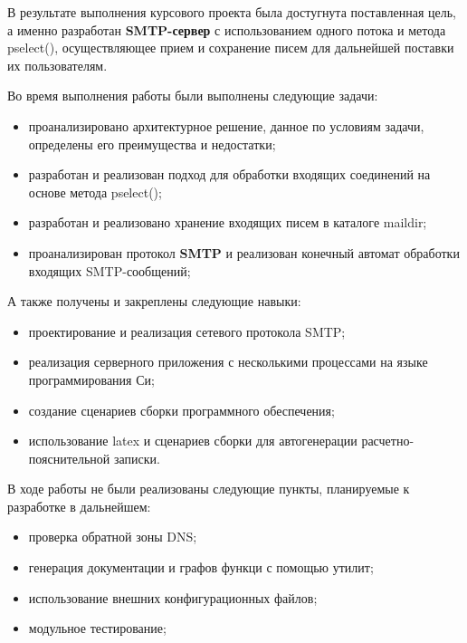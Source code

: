 \documentclass[a4paper,12pt]{report}
\begin{document}
В результате выполнения курсового проекта была достугнута поставленная цель, а именно разработан
\textbf{SMTP-сервер} с использованием одного потока и метода pselect(), осуществляющее прием и сохранение писем
для дальнейшей поставки их пользователям.

Во время выполнения работы были выполнены следующие задачи:
\begin{itemize}
    \item проанализировано архитектурное решение, данное по условиям задачи, определены его преимущества и недостатки;
    \item разработан и реализован подход для обработки входящих соединений на основе метода pselect();
    \item разработан и реализовано хранение входящих писем в каталоге maildir;
    \item проанализирован протокол \textbf{SMTP} и реализован конечный автомат обработки входящих SMTP-сообщений;
\end{itemize}

А также получены и закреплены следующие навыки:
\begin{itemize}
    \item проектирование и реализация сетевого протокола SMTP;
    \item реализация серверного приложения с несколькими процессами на языке программирования Си;
    \item создание сценариев сборки программного обеспечения;
    \item использование latex и сценариев сборки для автогенерации расчетно-пояснительной записки.
\end{itemize}

В ходе работы не были реализованы следующие пункты, планируемые к разработке в дальнейшем:
\begin{itemize}
    \item проверка обратной зоны DNS;
    \item генерация документации и графов функци с помощью утилит;
    \item использование внешних конфигурационных файлов;
    \item модульное тестирование;
\end{itemize}
\end{document}
